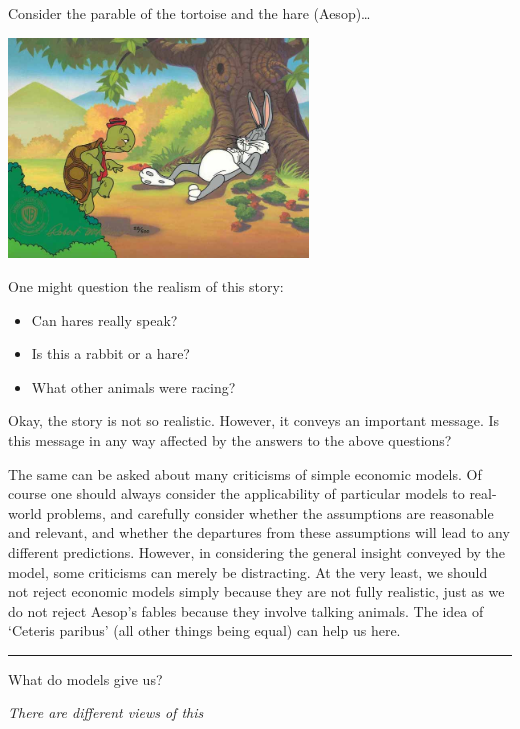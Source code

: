 \documentclass[]{article}
\begin{document}
Consider the parable of the tortoise and the hare (Aesop)\ldots{}

\medskip

\includegraphics[height=2.3in]{picsfigs/tortoisehare.jpg}

\bigskip

\footnotesize

One might question the realism of this story:

\begin{itemize}
\item
  Can hares really speak?
\item
  Is this a rabbit or a hare?
\item
  What other animals were racing?
\end{itemize}

Okay, the story is not so realistic. However, it conveys an important
message. Is this message in any way affected by the answers to the above
questions?

The same can be asked about many criticisms of simple economic models.
Of course one should always consider the applicability of particular
models to real-world problems, and carefully consider whether the
assumptions are reasonable and relevant, and whether the departures from
these assumptions will lead to any different predictions. However, in
considering the general insight conveyed by the model, some criticisms
can merely be distracting. At the very least, we should not reject
economic models simply because they are not fully realistic, just as we
do not reject Aesop's fables because they involve talking animals. The
idea of `Ceteris paribus' (all other things being equal) can help us
here.

\begin{center}\rule{0.5\linewidth}{\linethickness}\end{center}

What do models give us?

\emph{\textcolor{OliveGreen}{There are different views of this}}
\end{document}
